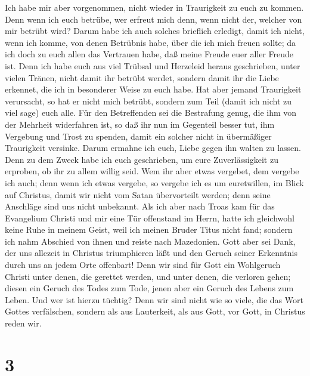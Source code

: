  Ich habe mir aber vorgenommen, nicht wieder in
Traurigkeit zu euch zu kommen.  Denn wenn ich euch
betrübe, wer erfreut mich denn, wenn nicht der, welcher von mir betrübt
wird?  Darum habe ich auch solches brieflich erledigt,
damit ich nicht, wenn ich komme, von denen Betrübnis habe, über die ich
mich freuen sollte; da ich doch zu euch allen das Vertrauen habe, daß
meine Freude euer aller Freude ist.  Denn ich habe euch
aus viel Trübsal und Herzeleid heraus geschrieben, unter vielen Tränen,
nicht damit ihr betrübt werdet, sondern damit ihr die Liebe erkennet,
die ich in besonderer Weise zu euch habe.  Hat aber jemand
Traurigkeit verursacht, so hat er nicht mich betrübt, sondern zum Teil
(damit ich nicht zu viel sage) euch alle.  Für den
Betreffenden sei die Bestrafung genug, die ihm von der Mehrheit
widerfahren ist,  so daß ihr nun im Gegenteil besser tut,
ihm Vergebung und Trost zu spenden, damit ein solcher nicht in
übermäßiger Traurigkeit versinke.  Darum ermahne ich euch,
Liebe gegen ihn walten zu lassen.  Denn zu dem Zweck habe
ich euch geschrieben, um eure Zuverlässigkeit zu erproben, ob ihr zu
allem willig seid.  Wem ihr aber etwas vergebet, dem
vergebe ich auch; denn wenn ich etwas vergebe, so vergebe ich es um
euretwillen, im Blick auf Christus,  damit wir nicht vom
Satan übervorteilt werden; denn seine Anschläge sind uns nicht
unbekannt.  Als ich aber nach Troas kam für das
Evangelium Christi und mir eine Tür offenstand im Herrn, hatte ich
gleichwohl keine Ruhe in meinem Geist, weil ich meinen Bruder Titus
nicht fand;  sondern ich nahm Abschied von ihnen und
reiste nach Mazedonien.  Gott aber sei Dank, der uns
allezeit in Christus triumphieren läßt und den Geruch seiner Erkenntnis
durch uns an jedem Orte offenbart!  Denn wir sind für
Gott ein Wohlgeruch Christi unter denen, die gerettet werden, und unter
denen, die verloren gehen;  diesen ein Geruch des Todes
zum Tode, jenen aber ein Geruch des Lebens zum Leben. Und wer ist hierzu
tüchtig?  Denn wir sind nicht wie so viele, die das Wort
Gottes verfälschen, sondern als aus Lauterkeit, als aus Gott, vor Gott,
in Christus reden wir.

\hypertarget{section-2}{%
\section{3}\label{section-2}}


